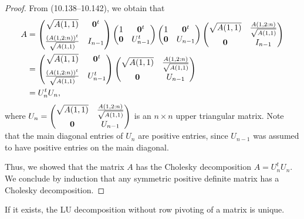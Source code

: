 \begin{proof}
From (10.138--10.142), we obtain that
\begin{align*}
A &= \begin{pmatrix} \sqrt{A(1,1)} & \mathbf{0}^t \\[0.6em]
\frac{(A(1,2:n))^t}{\sqrt{A(1,1)}} & I_{n-1} \end{pmatrix}
\begin{pmatrix} 1 & \mathbf{0}^t \\ \mathbf{0} & U_{n-1}^t \end{pmatrix}
\begin{pmatrix} 1 & \mathbf{0}^t \\ \mathbf{0} & U_{n-1} \end{pmatrix}
\begin{pmatrix} \sqrt{A(1,1)} & \frac{A(1,2:n)}{\sqrt{A(1,1)}} \\[0.6em]
\mathbf{0} & I_{n-1} \end{pmatrix} \\
&= \begin{pmatrix} \sqrt{A(1,1)} & \mathbf{0}^t \\[0.6em]
\frac{(A(1,2:n))^t}{\sqrt{A(1,1)}} & U_{n-1}^t \end{pmatrix}
\begin{pmatrix} \sqrt{A(1,1)} & \frac{A(1,2:n)}{\sqrt{A(1,1)}} \\[0.6em]
\mathbf{0} & U_{n-1} \end{pmatrix} \\
&= U_n^tU_n,
\end{align*}
where $U_n = \begin{pmatrix} \sqrt{A(1,1)} & \frac{A(1,2:n)}{\sqrt{A(1,1)}} \\[0.6em]
\mathbf{0} & U_{n-1} \end{pmatrix}$ is an $n \times n$ upper triangular matrix. Note that the
main diagonal entries of $U_n$ are positive entries, since $U_{n-1}$ was assumed to
have positive entries on the main diagonal.

Thus, we showed that the matrix $A$ has the Cholesky decomposition $A = U_n^tU_n$.
We conclude by induction that any symmetric positive definite matrix has a Cholesky
decomposition.
\end{proof}

\begin{theorem}
If it exists, the LU decomposition without row pivoting of a matrix is unique.
\end{theorem}

